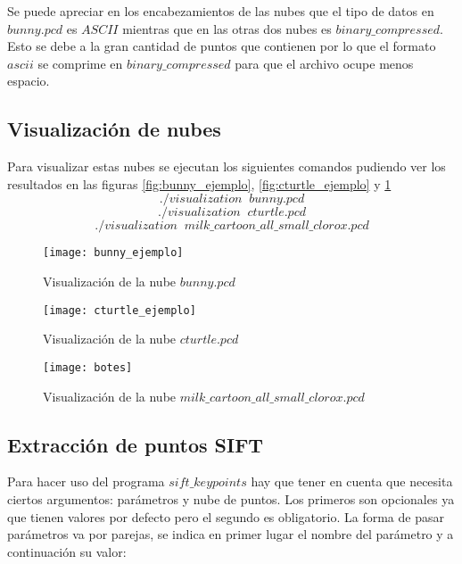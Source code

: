 Se puede apreciar en los encabezamientos de las nubes que el tipo de datos en $bunny.pcd$ es $ASCII$ mientras que en las otras dos nubes es $binary\_compressed$. Esto se debe a la gran cantidad de puntos que contienen por lo que el formato $ascii$ se comprime en $binary\_compressed$ para que el archivo ocupe menos espacio.

\subsection{Visualización de nubes}
Para visualizar estas nubes se ejecutan los siguientes comandos pudiendo ver los resultados en las figuras \ref{fig:bunny_ejemplo}, \ref{fig:cturtle_ejemplo} y \ref{fig:botes} 
$$./visualization\;\;bunny.pcd$$
$$./visualization\;\;cturtle.pcd$$
$$./visualization\;\;milk\_cartoon\_all\_small\_clorox.pcd$$

\begin{figure}[!htb]
  \texttt{[image: bunny\_ejemplo]}
  \caption{Visualización de la nube $bunny.pcd$}\label{fig:bunny_ejemplo}
\endminipage\hfill
{}
  \texttt{[image: cturtle\_ejemplo]}
  \caption{Visualización de la nube $cturtle.pcd$}\label{fig:cturtle_ejemplo}
\endminipage\hfill
{}
  \texttt{[image: botes]}
  \caption{Visualización de la nube $milk\_cartoon\_all\_small\_clorox.pcd$}\label{fig:botes}
\endminipage\hfill
\end{figure}

\subsection{Extracción de puntos SIFT}

Para hacer uso del programa $sift\_keypoints$ hay que tener en cuenta que necesita ciertos argumentos: parámetros y nube de puntos. Los primeros son opcionales ya que tienen valores por defecto pero el segundo es obligatorio. La forma de pasar parámetros va por parejas, se indica en primer lugar el nombre del parámetro y a continuación su valor:

